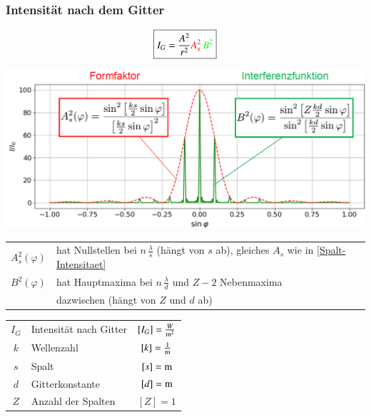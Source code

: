\subsubsection{Intensität nach dem Gitter}

$$ \boxed{ I_G = \frac{A^2}{r^2} \textcolor{red}{A_s^2} \, \textcolor{green}{B^2} }$$




\includegraphics[width=0.9\linewidth]{Bilder/Wellen-Optik/beugung_gitter_intensitaet} \\
\vspace{0.2cm} 
\renewcommand{\arraystretch}{1.2}
\begin{tabular}{ll}
$A_s^2(\varphi)$ & hat Nullstellen bei $n \, \frac{\lambda}{s}$ (hängt von $s$ ab), gleiches $A_s$ wie in \ref{Spalt-Intensitaet} \\
$B^2(\varphi)$ & hat Hauptmaxima bei $n \, \frac{\lambda}{d}$ und $Z - 2$ Nebenmaxima\\
& dazwischen (hängt von $Z$ und $d$ ab)\\
\end{tabular}
\renewcommand{\arraystretch}{1}


\vspace{0.2cm}

\renewcommand{\arraystretch}{1.3}
\begin{tabular}{clc}
$I_G$ & Intensität nach Gitter & $[I_G] = \frac{W}{\mathrm{m}^2}$ \\
$k$ & Wellenzahl & $[k] = \frac{1}{\mathrm{m}}$ \\
$s$ & Spalt & $[s] = \mathrm{m}$ \\
$d$ & Gitterkonstante & $[d] = \mathrm{m}$ \\
$Z$ & Anzahl der Spalten & $[Z] = 1$
\end{tabular}
\renewcommand{\arraystretch}{1}

